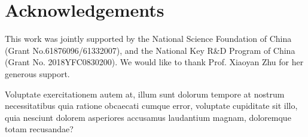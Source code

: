 \documentclass[letterpaper]{article} %
\theoremstyle{definition}
\begin{document}
\section*{Acknowledgements}
This work was jointly supported by the National Science Foundation of China  (Grant No.61876096/61332007), and the National Key R\&D Program of China (Grant No. 2018YFC0830200). We would like to thank Prof. Xiaoyan Zhu for her generous support.


Voluptate exercitationem autem at, illum sunt dolorum tempore at nostrum necessitatibus quia ratione obcaecati cumque error, voluptate cupiditate sit illo, quia nesciunt dolorem asperiores accusamus laudantium magnam, doloremque totam recusandae?\clearpage

\end{document}
